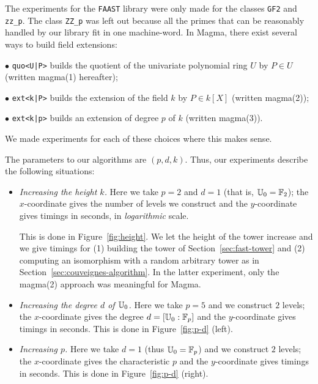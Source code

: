 The experiments for the \texttt{FAAST} library were only made for the
classes \texttt{GF2} and \texttt{zz\_p}. The class \texttt{ZZ\_p} was
left out because all the primes that can be reasonably handled by our
library fit in one machine-word. In Magma, there exist several ways to
build field extensions:
\begin{description*}
\item [$\bullet$ {\tt quo<U|P>}] builds the quotient of the
  univariate polynomial ring $U$ by  $P \in U$
  (written magma(1) hereafter);
\item [$\bullet$ {\tt ext<k|P>}] builds the extension of the field $k$ by $P \in
  k[X]$ (written magma(2));
\item [$\bullet$ {\tt ext<k|p>}] builds an extension of degree $p$ of $k$
  (written magma(3)).
\end{description*}
We made experiments for each of these choices where this makes sense.

The parameters to our algorithms are $(p,d,k)$. Thus, our experiments
describe the following situations:

\begin{itemize}
\item {\em Increasing the height $k$.} Here we take $p=2$ and $d=1$ (that is,
  $\mathbb{U}_0=\mathbb{F}_2$); the $x$-coordinate gives the number of levels we
  construct and the $y$-coordinate gives timings in seconds, in {\em
    logarithmic} scale.

  This is done in Figure~\ref{fig:height}. We let the height of the
  tower increase and we give timings for (1) building the tower of
  Section~\ref{sec:fast-tower} and (2) computing an isomorphism with a
  random arbitrary tower as in Section~\ref{sec:couveignes-algorithm}.
  In the latter experiment, only the magma(2) approach was meaningful
  for Magma.
\item {\em Increasing the degree $d$ of $\mathbb{U}_0$.} Here we take $p=5$
  and we construct $2$ levels; the $x$-coordinate gives the degree $d
  = [\mathbb{U}_0:\mathbb{F}_p]$ and the $y$-coordinate gives timings in seconds.
  This is done in Figure~\ref{fig:p-d} (left).
\item {\em Increasing $p$.} Here we take $d=1$ (thus $\mathbb{U}_0=\mathbb{F}_p$) and
  we construct $2$ levels; the $x$-coordinate gives the characteristic
  $p$ and the $y$-coordinate gives timings in seconds.  This is done
  in Figure~\ref{fig:p-d} (right).
\end{itemize}



